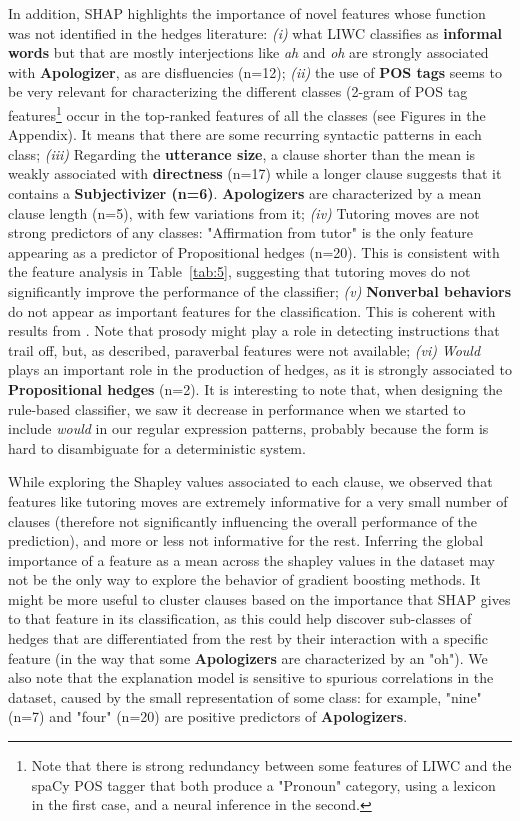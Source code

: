 \documentclass[11pt]{article}
\begin{document}
\noindent In addition, SHAP highlights the importance of novel features whose function was not identified in the hedges literature: \textit{(i)} what LIWC classifies as \textbf{informal words} but that are mostly interjections like \textit{ah} and \textit{oh} are strongly associated with \textbf{Apologizer}, as are disfluencies (n=12); \textit{(ii)} the use of \textbf{POS tags} seems to be very relevant for characterizing the different classes (2-gram of POS tag features\footnote{Note that there is strong redundancy between some features of LIWC and the spaCy POS tagger that both produce a "Pronoun" category, using a lexicon in the first case, and a neural inference in the second.} occur in the top-ranked features of all the classes (see Figures in the Appendix). It means that there are some recurring syntactic patterns in each class; \textit{(iii)} Regarding the \textbf{utterance size}, a clause shorter than the mean is weakly associated with \textbf{directness} (n=17) while a longer clause suggests that it contains a \textbf{Subjectivizer (n=6)}. \textbf{Apologizers} are characterized by a mean clause length (n=5), with few variations from it; \textit{(iv)} Tutoring moves are not strong predictors of any classes: "Affirmation from tutor" is the only feature appearing as a predictor of Propositional hedges (n=20). This is consistent with the feature analysis in Table~\ref{tab:5}, suggesting that tutoring moves do not significantly improve the performance of the classifier; \textit{(v)} \textbf{Nonverbal behaviors} do not appear as important features for the classification. This is coherent with results from \cite{Goel2019}. Note that prosody might play a role in detecting instructions that trail off, but, as described, paraverbal features were not available; \textit{(vi)} \textit{Would} plays an important role in the production of hedges, as it is strongly associated to \textbf{Propositional hedges} (n=2). It is interesting to note that, when designing the rule-based classifier, we saw it decrease in performance when we started to include \textit{would} in our regular expression patterns, probably because the form is hard to disambiguate for a deterministic system.

\noindent While exploring the Shapley values associated to each clause, we observed that features like tutoring moves are extremely informative for a very small number of clauses (therefore not significantly influencing the overall performance of the prediction), and more or less not informative for the rest. Inferring the global importance of a feature as a mean across the shapley values in the dataset may not be the only way to explore the behavior of gradient boosting methods. It might be more useful to cluster clauses based on the importance that SHAP gives to that feature in its classification, as this could help discover sub-classes of hedges that are differentiated from the rest by their interaction with a specific feature (in the way that some \textbf{Apologizers} are characterized by an "oh").
\noindent We also note that the explanation model is sensitive to spurious correlations in the dataset, caused by the small representation of some class: for example, "nine" (n=7) and "four" (n=20) are positive predictors of \textbf{Apologizers}.
\end{document}
